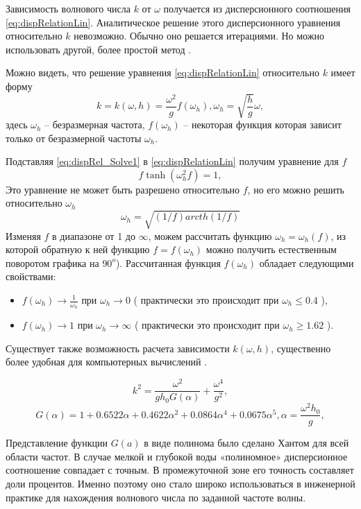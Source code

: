 
Зависимость волнового числа $k$ от $\omega$ получается из дисперсионного соотношения \eqref{eq:dispRelationLin}. Аналитическое решение этого дисперсионного уравнения относительно $k$ невозможно. Обычно оно решается итерациями. Но можно использовать другой, более простой метод \cite{kras} \cite{Zasl_Kras_2001}.

Можно видеть, что решение уравнения \eqref{eq:dispRelationLin} относительно $k$ имеет форму
\begin{equation}\label{eq:dispRel_Solve1}
  k=k(\omega,h)=\frac{\omega^2}{g}f(\omega_h), \omega_h=\sqrt{\frac{h}{g}}\omega,
\end{equation}
здесь $\omega_h$ -- безразмерная частота, $f(\omega_h)$ -- некоторая функция которая зависит только от безразмерной частоты $\omega_h$.

Подставляя \eqref{eq:dispRel_Solve1} в \eqref{eq:dispRelationLin} получим уравнение для $f$
$$
f\tanh(\omega_h^2f)=1,
$$
Это уравнение не может быть разрешено относительно $f$, но его можно решить относительно $\omega_h$
$$
\omega_h = \sqrt{(1/f)arcth(1/f)}
$$
Изменяя $f$ в диапазоне от 1 до $\infty$, можем рассчитать функцию $\omega_h=\omega_h(f)$, из которой обратную к ней функцию $f=f(\omega_h)$ можно получить естественным поворотом графика на $90^o$). Рассчитанная функция $f(\omega_h)$ обладает следующими свойствами:
\begin{itemize}
  \item $f(\omega_h)\rightarrow\frac{1}{\omega_h}$ при $\omega_h\rightarrow0$ ( практически это происходит при $\omega_h\leq0.4$ \cite{Zasl_Kras_2001}),
  \item $f(\omega_h)\rightarrow1$ при $\omega_h\rightarrow\infty$ ( практически это происходит при $\omega_h\geq1.62$ \cite{Zasl_Kras_2001}).
\end{itemize}

Существует также возможность расчета зависимости $k(\omega,h)$, существенно более удобная для компьютерных вычислений \cite{hunt}.

\begin{equation}\label{eq:hantApprox}
  k^2=\frac{\omega^2}{gh_0G(\alpha)}+\frac{\omega^4}{g^2},
\end{equation}
$$
G(\alpha)=1+0.6522\alpha+0.4622\alpha^2+0.0864\alpha^4+0.0675\alpha^5, \alpha=\frac{\omega^2h_0}{g},
$$

Представление функции $G(a)$ в виде полинома было сделано Хантом \cite{hunt} для всей области частот. В случае мелкой и глубокой воды «полиномное» дисперсионное соотношение совпадает с точным. В промежуточной зоне его точность составляет доли процентов. Именно поэтому оно стало широко использоваться в инженерной практике для нахождения волнового числа по заданной частоте волны.


